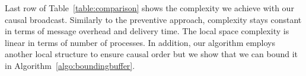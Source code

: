 Last row of Table~\ref{table:comparison} shows the complexity we achieve with
our causal broadcast. Similarly to the preventive approach, complexity stays
constant in terms of message overhead and delivery time. The local space
complexity is linear in terms of number of processes.  In addition, our algorithm employs another
local structure to ensure causal order but we show that we can bound it in
Algorithm~\ref{algo:boundingbuffer}.



